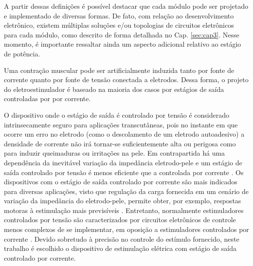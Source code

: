 A partir dessas definições é possível destacar que cada módulo pode ser projetado e implementado de diversas formas. De fato, com relação ao desenvolvimento eletrônico, existem múltiplas soluções e/ou topologias de circuitos eletrônicos para cada módulo, como descrito de forma detalhada no Cap. \ref{sec:cap3}. Nesse momento, é importante ressaltar ainda um aspecto adicional relativo ao estágio de potência. 

Uma contração muscular pode ser artificialmente induzida tanto por fonte de corrente quanto por fonte de tensão conectada a eletrodos. Dessa forma, o projeto do eletroestimulador é baseado na maioria dos casos por estágios de saída controladas por por corrente. 

O dispositivo onde o estágio de saída é controlado por tensão é considerado intrinsecamente seguro para aplicações transcutâneas, pois no instante em que ocorre um erro no eletrodo (como o descolamento de um eletrodo autoadesivo) a densidade de corrente não irá tornar-se suficientemente alta ou perigosa como para induzir queimaduras ou irritações na pele. Em contrapartida há uma dependência da inevitável variação da impedância eletrodo-pele e um estágio de saída controlado por tensão é menos eficiente que a controlada por corrente \cite{Wu2002}. Os dispositivos com o estágio de saída controlado por corrente são mais indicados para diversas aplicações, visto que regulação da carga fornecida em um cenário de variação da impedância do eletrodo-pele, permite obter, por exemplo, respostas motoras à estimulação mais previsíveis \cite{Wu2002}. Entretanto, normalmente estimuladores controlados por tensão são caracterizados por circuitos eletrônicos de controle menos complexos de se implementar, em oposição a estimuladores controlados por corrente \cite{Agarwala1986, H.1990}. Devido sobretudo à precisão no controle do estímulo fornecido, neste trabalho é escolhido o dispositivo de estimulação elétrica com estágio de saída controlado por corrente.